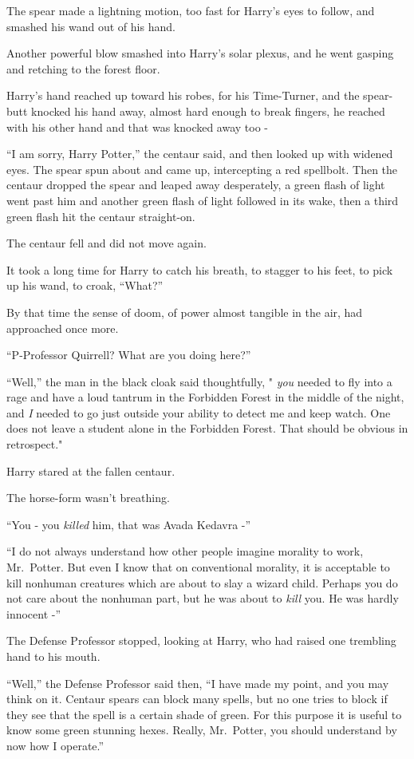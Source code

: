 The spear made a lightning motion, too fast for Harry's eyes to follow,
and smashed his wand out of his hand.

Another powerful blow smashed into Harry's solar plexus, and he went
gasping and retching to the forest floor.

Harry's hand reached up toward his robes, for his Time-Turner, and the
spear-butt knocked his hand away, almost hard enough to break fingers,
he reached with his other hand and that was knocked away too -

``I am sorry, Harry Potter,'' the centaur said, and then looked up with
widened eyes. The spear spun about and came up, intercepting a red
spellbolt. Then the centaur dropped the spear and leaped away
desperately, a green flash of light went past him and another green
flash of light followed in its wake, then a third green flash hit the
centaur straight-on.

The centaur fell and did not move again.

It took a long time for Harry to catch his breath, to stagger to his
feet, to pick up his wand, to croak, ``What?''

By that time the sense of doom, of power almost tangible in the air, had
approached once more.

``P-Professor Quirrell? What are you doing here?''

``Well,'' the man in the black cloak said thoughtfully, " \emph{you}
needed to fly into a rage and have a loud tantrum in the Forbidden
Forest in the middle of the night, and \emph{I} needed to go just
outside your ability to detect me and keep watch. One does not leave a
student alone in the Forbidden Forest. That should be obvious in
retrospect."

Harry stared at the fallen centaur.

The horse-form wasn't breathing.

``You - you \emph{killed} him, that was Avada Kedavra -''

``I do not always understand how other people imagine morality to work,
Mr.~Potter. But even I know that on conventional morality, it is
acceptable to kill nonhuman creatures which are about to slay a wizard
child. Perhaps you do not care about the nonhuman part, but he was about
to \emph{kill} you. He was hardly innocent -''

The Defense Professor stopped, looking at Harry, who had raised one
trembling hand to his mouth.

``Well,'' the Defense Professor said then, ``I have made my point, and
you may think on it. Centaur spears can block many spells, but no one
tries to block if they see that the spell is a certain shade of green.
For this purpose it is useful to know some green stunning hexes. Really,
Mr.~Potter, you should understand by now how I operate.''

